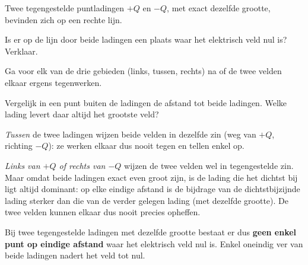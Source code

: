 \documentclass{ximera}
\begin{document}
\begin{question}
    Twee tegengestelde puntladingen $+Q$ en $-Q$, met exact dezelfde grootte, bevinden zich op een rechte lijn.

    \begin{center}
    \end{center}

    Is er op de lijn door beide ladingen een plaats waar het elektrisch veld nul is? Verklaar.

    \begin{multipleChoice}
    \end{multipleChoice}

    \begin{hint}
        Ga voor elk van de drie gebieden (links, tussen, rechts) na of de twee velden elkaar ergens tegenwerken.
    \end{hint}
    \begin{hint}
        Vergelijk in een punt buiten de ladingen de afstand tot beide ladingen. Welke lading levert daar altijd het grootste veld?
    \end{hint}

    \begin{solution}\nl
        \emph{Tussen} de twee ladingen wijzen beide velden in dezelfde zin (weg van $+Q$, richting $-Q$): ze werken elkaar dus nooit tegen en tellen enkel op.

        \emph{Links van $+Q$ of rechts van $-Q$} wijzen de twee velden wel in tegengestelde zin. Maar omdat beide ladingen exact even groot zijn, is de lading die het dichtst bij ligt altijd dominant: op elke eindige afstand is de bijdrage van de dichtstbijzijnde lading sterker dan die van de verder gelegen lading (met dezelfde grootte). De twee velden kunnen elkaar dus nooit precies opheffen.

        Bij twee tegengestelde ladingen met dezelfde grootte bestaat er dus \textbf{geen enkel punt op eindige afstand} waar het elektrisch veld nul is. Enkel oneindig ver van beide ladingen nadert het veld tot nul.
    \end{solution}
\end{question}
\end{document}

